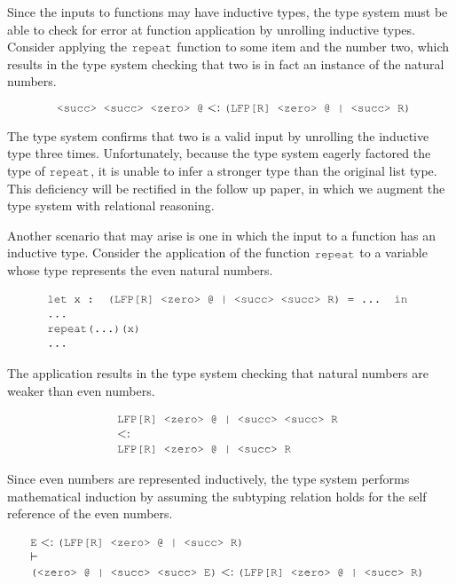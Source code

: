 \documentclass[acmsmall]{acmart}
\theoremstyle{definition}
\begin{document}
Since the inputs to functions may have inductive types, the type 
system must be able to check for error at function application by unrolling
inductive types.
Consider applying the $\J{repeat}$ function to some item and the number two, 
which results in the type system checking that two is in fact an instance of the natural numbers.

\[
  \J{ <succ> <succ> <zero> @} \subtypes \J{(LFP[R] <zero> @ | <succ> R)}
\]

The type system confirms that two is a valid input by unrolling the inductive type three times.
Unfortunately, because the type system eagerly factored the type of $\J{repeat}$, it
is unable to infer a stronger type than the original list type. This deficiency will
be rectified in the follow up paper, in which we augment the type system with relational reasoning.


Another scenario that may arise is one in which the input to a function has an inductive type.
Consider the application of the function $\J{repeat}$ to a variable whose type represents the even natural numbers.

\[
  \begin{array}[t]{@{} l}
    \J{let x : (LFP[R] <zero> @ | <succ> <succ> R) = ... in}
    \\
    \J{...}
    \\
    \J{repeat(...)(x)} 
    \\
    \J{...}
  \end{array}
\]

The application results in the type system checking that natural numbers are weaker than even numbers. 

\[
  \begin{array}[t]{@{} l}
    \J{LFP[R] <zero> @ | <succ> <succ> R}
    \\
    \subtypes
    \\
    \J{LFP[R] <zero> @ | <succ> R}
  \end{array}
\]


Since even numbers are represented inductively, the type system performs mathematical induction
by assuming the subtyping relation holds for the self reference of the even numbers. 

\[
  \begin{array}[t]{@{} l}
    \J{E} \subtypes \J{(LFP[R] <zero> @ | <succ> R)}
    \\
    \entails
    \\
    \J{(<zero> @ | <succ> <succ> E)} \subtypes \J{(LFP[R] <zero> @ | <succ> R)}
  \end{array}
\]
\end{document}
